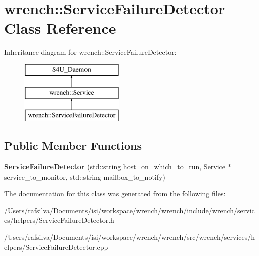 \hypertarget{classwrench_1_1_service_failure_detector}{}\section{wrench\+:\+:Service\+Failure\+Detector Class Reference}
\label{classwrench_1_1_service_failure_detector}
Inheritance diagram for wrench\+:\+:Service\+Failure\+Detector\+:\begin{figure}[H]
\begin{center}
\leavevmode
\includegraphics[height=3.000000cm]{classwrench_1_1_service_failure_detector}
\end{center}
\end{figure}
\subsection*{Public Member Functions}
\begin{DoxyCompactItemize}
\item 
\mbox{\label{classwrench_1_1_service_failure_detector_a8c90fc986c6061173c1db533f3d407d1}} 
{\bfseries Service\+Failure\+Detector} (std\+::string host\+\_\+on\+\_\+which\+\_\+to\+\_\+run, \hyperlink{classwrench_1_1_service}{Service} $\ast$service\+\_\+to\+\_\+monitor, std\+::string mailbox\+\_\+to\+\_\+notify)
\end{DoxyCompactItemize}


The documentation for this class was generated from the following files\+:\begin{DoxyCompactItemize}
\item 
/\+Users/rafsilva/\+Documents/isi/workspace/wrench/wrench/include/wrench/services/helpers/Service\+Failure\+Detector.\+h\item 
/\+Users/rafsilva/\+Documents/isi/workspace/wrench/wrench/src/wrench/services/helpers/Service\+Failure\+Detector.\+cpp\end{DoxyCompactItemize}
